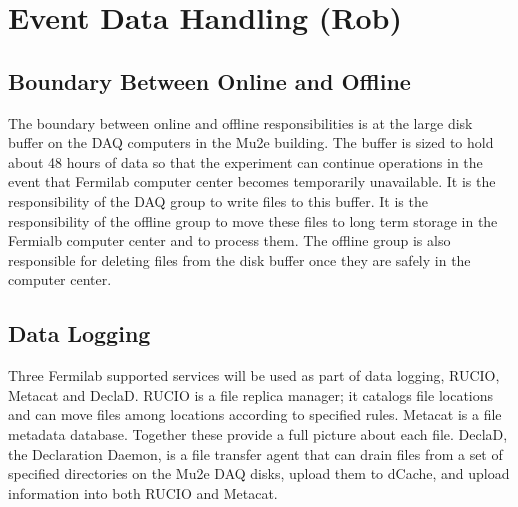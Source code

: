 \section{Event Data Handling (Rob)}
\label{sec:datahandling}



\subsection{Boundary Between Online and Offline}
\label{ssec:datahandling:boudary}

The boundary between online and offline responsibilities is at the large disk buffer on the DAQ computers in the Mu2e building.
The buffer is sized to hold about 48 hours of data so that the experiment can continue operations in the event that Fermilab computer center becomes temporarily unavailable.
It is the responsibility of the DAQ group to write files to this buffer. It is the responsibility of the offline group to move these files to long term storage in the Fermialb computer center and to process them.
The offline group is also responsible for deleting files from the disk buffer once they are safely in the computer center.

\subsection{Data Logging}
\label{ssec:datahandling:datalogging}

Three Fermilab supported services will be used as part of data logging, RUCIO, Metacat and DeclaD.  
RUCIO is a file replica manager;
it catalogs file locations and can move files among locations according to specified rules. Metacat is a file metadata database.
Together these provide a full picture about each file.
DeclaD, the Declaration Daemon, is a file transfer agent that can drain files from a set of specified directories on the Mu2e DAQ disks, upload them to dCache,
and upload information into both RUCIO and Metacat.

